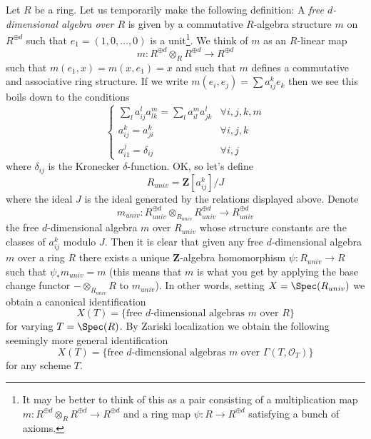 \medskip\noindent
Let $R$ be a ring. Let us temporarily make the following definition:
A {\it free $d$-dimensional algebra over $R$}
is given by a commutative $R$-algebra structure $m$ on $R^{\oplus d}$
such that $e_1 = (1, 0, \ldots, 0)$ is a unit\footnote{It may be better
to think of this as a pair consisting of a multiplication map
$m : R^{\oplus d} \otimes_R R^{\oplus d} \to R^{\oplus d}$ and
a ring map $\psi : R \to R^{\oplus d}$ satisfying a bunch of axioms.}.
We think of $m$ as an $R$-linear map
$$
m : R^{\oplus d} \otimes_R R^{\oplus d} \longrightarrow R^{\oplus d}
$$
such that $m(e_1, x) = m(x, e_1) = x$ and such that $m$ defines a
commutative and associative ring structure. If we write
$m(e_i, e_j) = \sum a_{ij}^ke_k$ then we see this boils down
to the conditions
$$
\left\{
\begin{matrix}
\sum_l a_{ij}^la_{lk}^m = \sum_l a_{il}^ma_{jk}^l & \forall i, j, k, m \\
a_{ij}^k = a_{ji}^k & \forall i, j, k \\
a_{i1}^j = \delta_{ij} & \forall i, j
\end{matrix}
\right.
$$
where $\delta_{ij}$ is the Kronecker $\delta$-function. OK, so let's define
$$
R_{univ} = \mathbf{Z}[a_{ij}^k]/J
$$
where the ideal $J$ is the ideal generated by the relations displayed above.
Denote
$$
m_{univ} :
R_{univ}^{\oplus d} \otimes_{R_{univ}} R_{univ}^{\oplus d}
\longrightarrow
R_{univ}^{\oplus d}
$$
the free $d$-dimensional algebra $m$ over $R_{univ}$ whose structure
constants are the classes of $a_{ij}^k$ modulo $J$.
Then it is clear that given any free $d$-dimensional algebra $m$ over a ring
$R$ there exists a unique $\mathbf{Z}$-algebra homomorphism
$\psi : R_{univ} \to R$ such that $\psi_*m_{univ} = m$ (this means that
$m$ is what you get by applying the base change functor
$- \otimes_{R_{univ}} R$ to $m_{univ}$). In other words, setting
$X = \Spec(R_{univ})$ we obtain a canonical identification
$$
X(T) = \{\text{free }d\text{-dimensional algebras }m\text{ over }R\}
$$
for varying $T = \Spec(R)$. By Zariski localization we obtain
the following seemingly more general identification
\begin{equation}
\label{equation-objects}
X(T) = \{\text{free }d\text{-dimensional algebras }
m\text{ over }\Gamma(T, \mathcal{O}_T)\}
\end{equation}
for any scheme $T$.

